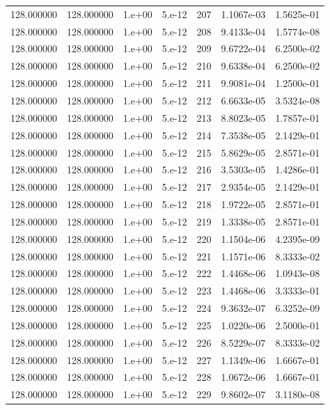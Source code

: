 \begin{table}[htbp]
\begin{tabular}{rrrrrrr}
128.000000 & 128.000000 & 1.e+00 & 5.e-12 & 207 & 1.1067e-03 & 1.5625e-01 \\
128.000000 & 128.000000 & 1.e+00 & 5.e-12 & 208 & 9.4133e-04 & 1.5774e-08 \\
128.000000 & 128.000000 & 1.e+00 & 5.e-12 & 209 & 9.6722e-04 & 6.2500e-02 \\
128.000000 & 128.000000 & 1.e+00 & 5.e-12 & 210 & 9.6338e-04 & 6.2500e-02 \\
128.000000 & 128.000000 & 1.e+00 & 5.e-12 & 211 & 9.9081e-04 & 1.2500e-01 \\
128.000000 & 128.000000 & 1.e+00 & 5.e-12 & 212 & 6.6633e-05 & 3.5324e-08 \\
128.000000 & 128.000000 & 1.e+00 & 5.e-12 & 213 & 8.8023e-05 & 1.7857e-01 \\
128.000000 & 128.000000 & 1.e+00 & 5.e-12 & 214 & 7.3538e-05 & 2.1429e-01 \\
128.000000 & 128.000000 & 1.e+00 & 5.e-12 & 215 & 5.8629e-05 & 2.8571e-01 \\
128.000000 & 128.000000 & 1.e+00 & 5.e-12 & 216 & 3.5303e-05 & 1.4286e-01 \\
128.000000 & 128.000000 & 1.e+00 & 5.e-12 & 217 & 2.9354e-05 & 2.1429e-01 \\
128.000000 & 128.000000 & 1.e+00 & 5.e-12 & 218 & 1.9722e-05 & 2.8571e-01 \\
128.000000 & 128.000000 & 1.e+00 & 5.e-12 & 219 & 1.3338e-05 & 2.8571e-01 \\
128.000000 & 128.000000 & 1.e+00 & 5.e-12 & 220 & 1.1504e-06 & 4.2395e-09 \\
128.000000 & 128.000000 & 1.e+00 & 5.e-12 & 221 & 1.1571e-06 & 8.3333e-02 \\
128.000000 & 128.000000 & 1.e+00 & 5.e-12 & 222 & 1.4468e-06 & 1.0943e-08 \\
128.000000 & 128.000000 & 1.e+00 & 5.e-12 & 223 & 1.4468e-06 & 3.3333e-01 \\
128.000000 & 128.000000 & 1.e+00 & 5.e-12 & 224 & 9.3632e-07 & 6.3252e-09 \\
128.000000 & 128.000000 & 1.e+00 & 5.e-12 & 225 & 1.0220e-06 & 2.5000e-01 \\
128.000000 & 128.000000 & 1.e+00 & 5.e-12 & 226 & 8.5229e-07 & 8.3333e-02 \\
128.000000 & 128.000000 & 1.e+00 & 5.e-12 & 227 & 1.1349e-06 & 1.6667e-01 \\
128.000000 & 128.000000 & 1.e+00 & 5.e-12 & 228 & 1.0672e-06 & 1.6667e-01 \\
128.000000 & 128.000000 & 1.e+00 & 5.e-12 & 229 & 9.8602e-07 & 3.1180e-08 \\

\end{tabular}
\end{table}
